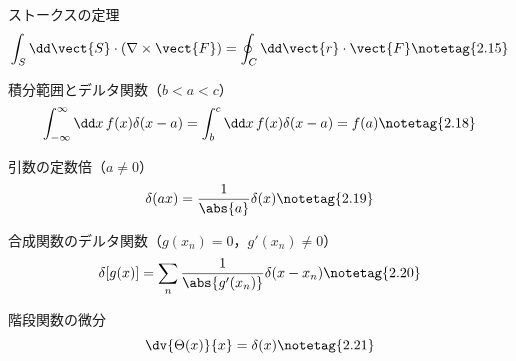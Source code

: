 \documentclass[uplatex,dvipdfmx,a4paper,11pt]{jsarticle}
\begin{document}
\begin{noteshikilist}
  \item ストークスの定理 %
    \[ \int_S \dd\vect{S}\cdot(\nabla\times\vect{F}) = \oint_C \dd\vect{r}\cdot\vect{F} \notetag{2.15} \]
  \item 積分範囲とデルタ関数（$b < a < c$） %
    \[ \int_{-\infty}^{\infty}\dd x\,f(x)\delta(x-a) = \int_b^c\dd x\,f(x)\delta(x-a) = f(a) \notetag{2.18} \]
  \item 引数の定数倍（$a \neq 0$） %
    \[ \delta(ax) = \frac{1}{\abs{a}}\delta(x) \notetag{2.19} \]
  \item 合成関数のデルタ関数（$g(x_n) = 0$，$g'(x_n) \neq 0$） %
    \[ \delta[g(x)] = \sum_n \frac{1}{\abs{g'(x_n)}}\delta(x - x_n) \notetag{2.20} \]
  \item 階段関数の微分 %
    \[ \dv{\Theta(x)}{x} = \delta(x) \notetag{2.21} \]
\end{noteshikilist}
\end{document}
